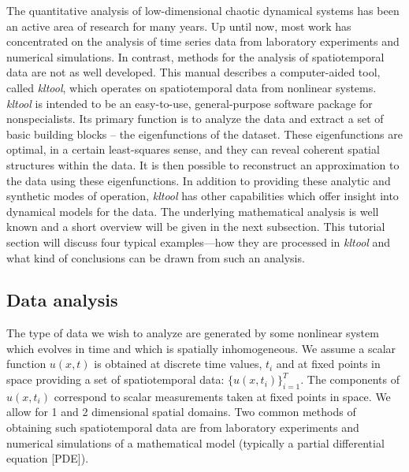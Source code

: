 The quantitative analysis of low-dimensional chaotic dynamical systems
has been an active area of research for many years.
Up until now, most work has concentrated on the analysis of time series
data from laboratory experiments and numerical simulations.
In contrast, methods for the analysis of spatiotemporal data are not
as well developed.
This manual describes a computer-aided tool, called {\sl kltool},
which operates on spatiotemporal data from nonlinear systems.
{\sl kltool} is intended to be an easy-to-use, general-purpose 
software package for nonspecialists.
Its primary function is to analyze the data and extract
a set of basic building blocks -- the eigenfunctions of the dataset.  
These eigenfunctions are optimal, in a certain least-squares sense, and
they can reveal coherent spatial structures within the data.
It is then possible to reconstruct an approximation to the data using
these eigenfunctions.  In addition to providing these analytic and 
synthetic modes
of operation, {\sl kltool} has other capabilities which offer insight into
dynamical models for the data.
The underlying mathematical analysis is well known and a short overview
will be given in the next subsection. 
This tutorial section will discuss four typical examples---how they
are processed
in {\sl kltool} and what kind of conclusions can be drawn from such an
analysis. 

\subsection{Data analysis}
The type of data we wish to analyze are generated by some nonlinear system 
which evolves in time and which is spatially inhomogeneous.
We assume a scalar function $u(x,t)$ is obtained
at discrete time values, $t_i$ and at fixed points in
space providing a set of spatiotemporal data:
$\{u(x,t_i)\}_{i=1}^T$.
The components of $u(x,t_i)$ correspond to scalar measurements taken
at fixed points in space.
We allow for 1 and 2 dimensional spatial domains.
Two common methods of obtaining such spatiotemporal data are from 
laboratory experiments and numerical simulations of a mathematical model
(typically a partial differential equation [PDE]).

